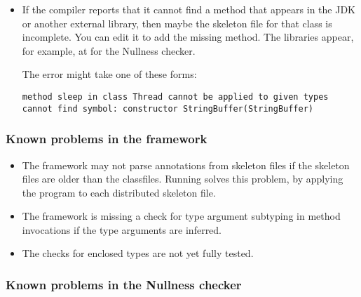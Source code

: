\begin{itemize}
\item
If the compiler reports that it cannot find a method that appears in the
JDK or another external library, then maybe the skeleton file for that
class is incomplete.  You can edit it to add the missing method.  The
libraries appear, for example, at  for the
Nullness checker.

The error might take one of these forms:

\begin{Verbatim}
method sleep in class Thread cannot be applied to given types
cannot find symbol: constructor StringBuffer(StringBuffer)
\end{Verbatim}


\end{itemize}


\subsubsection{Known problems in the framework\label{known-problems}}

\begin{itemize}

\item
  The framework may not parse annotations from skeleton files if the
  skeleton files are older than the classfiles.  Running  solves this problem, by applying the 
   program to each distributed skeleton file.

\item The framework is missing a check for type argument subtyping in
  method invocations if the type arguments are inferred.

\item The checks for enclosed types are not yet fully tested.

\end{itemize}

\subsubsection{Known problems in the Nullness checker}

